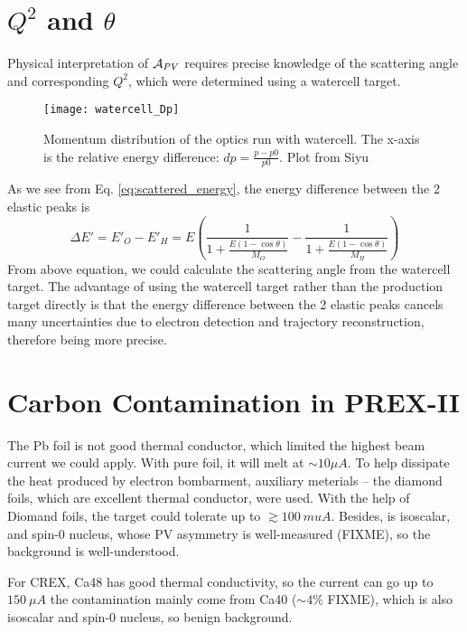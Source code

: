 \section{$Q^2$ and $\theta$}
Physical interpretation of $\mathcal{A}_{PV}$ requires precise knowledge
of the scattering angle and corresponding $Q^2$, which were determined using
a watercell target. 
\begin{figure}
    \centering
    \texttt{[image: watercell\_Dp]}
    \caption{Momentum distribution of the optics run with watercell. The x-axis
    is the relative energy difference: $dp = \frac{p - p0}{p0}$. Plot from Siyu}
\end{figure}
As we see from Eq. \ref{eq:scattered_energy}, the energy difference between the
2 elastic peaks is
\begin{equation}
    \Delta E' = E'_O - E'_H = E\left( \frac{1}{1 + \frac{E(1-\cos\theta)}{M_O}} -
    \frac{1}{1 + \frac{E(1-\cos\theta)}{M_H}} \right)
\end{equation}
From above equation, we could calculate the scattering angle from the watercell
target. The advantage of using the watercell target rather than the production
target directly is that the energy difference between the 2 elastic peaks cancels
many uncertainties due to electron detection and trajectory reconstruction, therefore
being more precise.

\section{Carbon Contamination in PREX-II}
The Pb foil is not good thermal conductor, which limited the highest beam current
we could apply. With pure \Pb foil, it will melt at $\sim 10 \mu A$. To help 
dissipate the heat produced by electron bombarment, auxiliary meterials -- the 
diamond foils, which are excellent thermal conductor, were used. 
With the help of Diomand foils, the
\Pb target could tolerate up to $\gtrsim 100\ mu A$. Besides, \C is isoscalar, and spin-0 
nucleus, whose PV asymmetry is well-measured (FIXME), so the background is 
well-understood. 

For CREX, Ca48 has good thermal conductivity, so the current can go up to $150\ \mu A$
the contamination mainly come from Ca40 ($\sim 4\%$ FIXME), which is also isoscalar
and spin-0 nucleus, so benign background.

